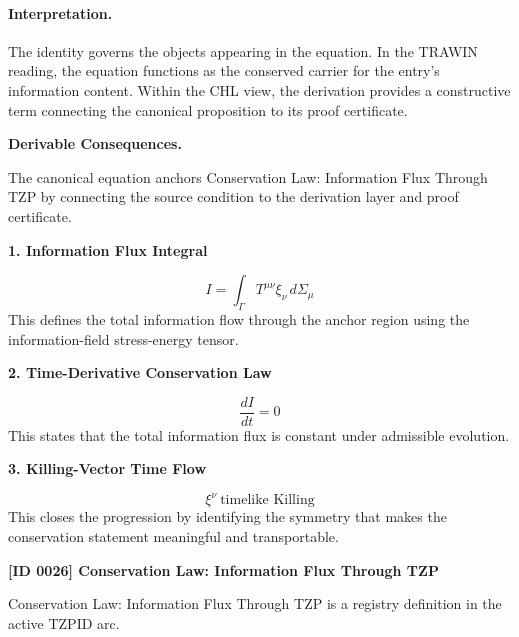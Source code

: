 \paragraph{Interpretation.}
The identity governs the objects appearing in the equation. In the TRAWIN reading, the equation functions as the conserved carrier for the entry’s information content. Within the CHL view, the derivation provides a constructive term connecting the canonical proposition to its proof certificate.

\par\vspace{0.35em}
\noindent\textbf{Derivable Consequences.}\quad
\begingroup
\footnotesize
\raggedright
The canonical equation anchors Conservation Law: Information Flux Through TZP by connecting the source condition to the derivation layer and proof certificate.
\par\endgroup

\noindent\textbf{1. Information Flux Integral}\par
\[
I
=
\int_{\Gamma}
T^{\mu\nu}\xi_{\nu}\, d\Sigma_{\mu}
\]
\noindent This defines the total information flow through the anchor region using the information-field stress-energy tensor.\par
\noindent\textbf{2. Time-Derivative Conservation Law}\par
\[
\frac{dI}{dt}=0
\]
\noindent This states that the total information flux is constant under admissible evolution.\par
\noindent\textbf{3. Killing-Vector Time Flow}\par
\[
\xi^{\nu}\ \text{timelike Killing}
\]
\noindent This closes the progression by identifying the symmetry that makes the conservation statement meaningful and transportable.\par

\clearpage
\noindent\textbf{[ID 0026] Conservation Law: Information Flux Through TZP}\par
\vspace{0.35em}
\begingroup\small
{}
Conservation Law: Information Flux Through TZP is a registry definition in the active TZPID arc.

